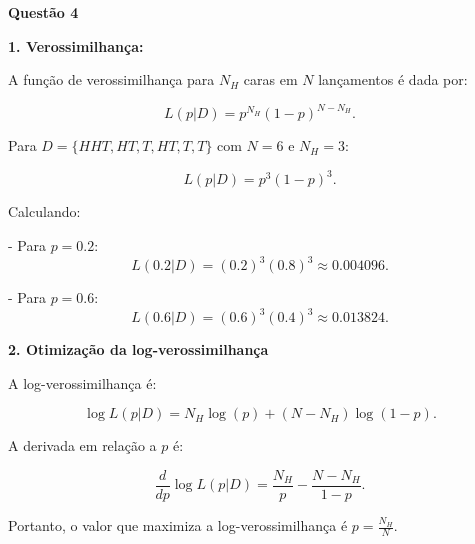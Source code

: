 \documentclass[12 pt]{article}
\begin{document}
\begin{tcolorbox}[colback=white, colframe=black, title=Resposta:]
    \textbf{Questão 4}

    \textbf{1. Verossimilhança:}

    A função de verossimilhança para \( N_H \) caras em \( N \) lançamentos é dada por:
    
    \[
    L(p|D) = p^{N_H} (1 - p)^{N - N_H}.
    \]
    
    Para \( D = \{HHT, HT, T, HT, T, T\} \) com \( N = 6 \) e \( N_H = 3 \):
    
    \[
    L(p|D) = p^{3} (1 - p)^{3}.
    \]
    
    Calculando:
    
    - Para \( p = 0.2 \):
    \[
    L(0.2|D) = (0.2)^{3} (0.8)^{3} \approx 0.004096.
    \]
    
    - Para \( p = 0.6 \):
    \[
    L(0.6|D) = (0.6)^{3} (0.4)^{3} \approx 0.013824.
    \]
    
    \textbf{2. Otimização da log-verossimilhança}

    A log-verossimilhança é:
    
    \[
    \log L(p|D) = N_H \log(p) + (N - N_H) \log(1 - p).
    \]
    
    A derivada em relação a \( p \) é:
    
    \[
    \frac{d}{dp} \log L(p|D) = \frac{N_H}{p} - \frac{N - N_H}{1 - p}.
    \]
    
    Portanto, o valor que maximiza a log-verossimilhança é \( p = \frac{N_H}{N} \).
    
\end{tcolorbox}
\end{document}
